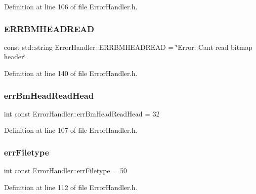 Definition at line 106 of file Error\+Handler.\+h.

\mbox{\label{classErrorHandler_ad44dda4b409046f04853a02d460be932}} 
\subsubsection{\texorpdfstring{ERRBMHEADREAD}{ERRBMHEADREAD}}
{\footnotesize\ttfamily const std\+::string Error\+Handler\+::\+E\+R\+R\+B\+M\+H\+E\+A\+D\+R\+E\+AD = \char`\"{}Error\+: Can\textquotesingle{}t read bitmap header\char`\"{}\hspace{0.3cm}{\ttfamily [static]}}



Definition at line 140 of file Error\+Handler.\+h.

\mbox{\label{classErrorHandler_a9af29b3a10176d3e75342926bebc51bc}} 
\subsubsection{\texorpdfstring{errBmHeadReadHead}{errBmHeadReadHead}}
{\footnotesize\ttfamily int const Error\+Handler\+::err\+Bm\+Head\+Read\+Head = 32\hspace{0.3cm}{\ttfamily [static]}}



Definition at line 107 of file Error\+Handler.\+h.

\mbox{\label{classErrorHandler_ae986729eee88277437cb64561249433d}} 
\subsubsection{\texorpdfstring{errFiletype}{errFiletype}}
{\footnotesize\ttfamily int const Error\+Handler\+::err\+Filetype = 50\hspace{0.3cm}{\ttfamily [static]}}



Definition at line 112 of file Error\+Handler.\+h.

